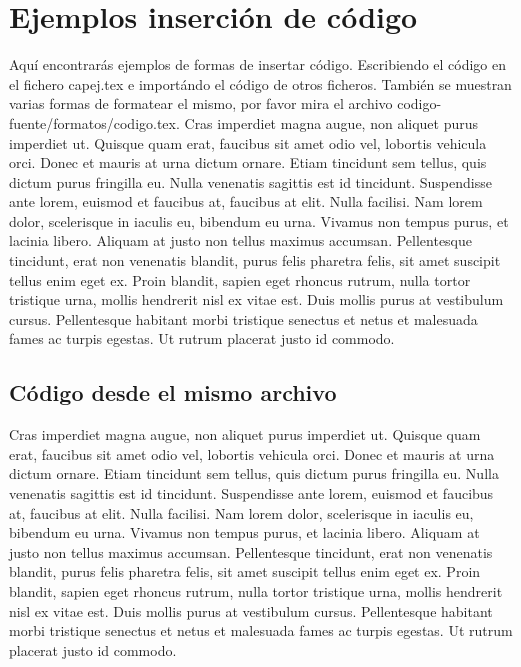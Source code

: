 \section{Ejemplos inserción de código}
Aquí encontrarás ejemplos de formas de insertar código. Escribiendo el código en  el fichero capej.tex e importándo el código de otros ficheros. También se muestran varias formas de formatear el mismo, por favor mira el archivo codigo-fuente/formatos/codigo.tex.
Cras imperdiet magna augue, non aliquet purus imperdiet ut. Quisque quam erat, faucibus sit amet odio vel, lobortis vehicula orci. Donec et mauris at urna dictum ornare. Etiam tincidunt sem tellus, quis dictum purus fringilla eu. Nulla venenatis sagittis est id tincidunt. Suspendisse ante lorem, euismod et faucibus at, faucibus at elit. Nulla facilisi. Nam lorem dolor, scelerisque in iaculis eu, bibendum eu urna. Vivamus non tempus purus, et\cite{book:vim-ref} lacinia libero. Aliquam at justo non tellus maximus accumsan. Pellentesque tincidunt, erat non venenatis blandit, purus felis pharetra felis, sit amet suscipit tellus enim eget ex. Proin blandit, sapien eget rhoncus rutrum, nulla tortor tristique urna, mollis hendrerit nisl ex vitae est. Duis mollis purus at vestibulum cursus. Pellentesque habitant morbi tristique senectus et netus et malesuada fames ac turpis egestas. Ut rutrum placerat justo id commodo.
\subsection{Código desde el mismo archivo}

Cras imperdiet magna augue, non aliquet purus imperdiet ut. Quisque quam erat, faucibus sit amet odio vel, lobortis vehicula orci. Donec et mauris at urna dictum ornare. Etiam tincidunt sem tellus, quis dictum purus fringilla eu. Nulla venenatis sagittis est id tincidunt. Suspendisse ante lorem, euismod et faucibus at, faucibus at elit. Nulla facilisi. Nam lorem dolor, scelerisque in iaculis eu, bibendum eu urna. Vivamus non tempus purus, et\cite{book:vim-ref} lacinia libero. Aliquam at justo non tellus maximus accumsan. Pellentesque tincidunt, erat non venenatis blandit, purus felis pharetra felis, sit amet suscipit tellus enim eget ex. Proin blandit, sapien eget rhoncus rutrum, nulla tortor tristique urna, mollis hendrerit nisl ex vitae est. Duis mollis purus at vestibulum cursus. Pellentesque habitant morbi tristique senectus et netus et malesuada fames ac turpis egestas. Ut rutrum placerat justo id commodo.

